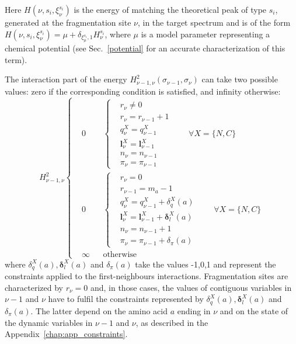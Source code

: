 Here $H(\nu,s_i,\xi_\nu^{s_i})$ is the energy of matching the theoretical peak
of type $s_i$, generated at the fragmentation site $\nu$, in the target spectrum and is
of the form $H(\nu,s_i,\xi_\nu^{s_i})=\mu+\delta_{\xi_\mu^{s_i},1}H_\nu^{s_i}$,
where $\mu$ is a model parameter representing a chemical potential (see
Sec.~\ref{potential} for an accurate characterization of this term).

The interaction part of the energy $H^2_{\nu-1,\nu}(\sigma_{\nu-1},\sigma_\nu)$
can take two possible values: zero if the corresponding condition is satisfied, and infinity
otherwise:
\begin{equation}
H^2_{\nu-1,\nu}
\left\{
\begin{aligned}
&0 && 
\left\{
\begin{aligned}
&r_\nu\ne0\\
&r_\nu=r_{\nu-1}+1\\
&q^X_\nu=q^X_{\nu-1}\\
&{\bm l}^X_\nu={\bm l}^X_{\nu-1}\\
&n_\nu=n_{\nu-1}\\
&\pi_\nu=\pi_{\nu-1}
\end{aligned}
\right.\qquad\forall X=\{N,C\}\\
&0 && 
\left\{
\begin{aligned}
&r_\nu=0\\
&r_{\nu-1}=m_{a}-1\\
&q^X_\nu=q^X_{\nu-1}+\delta_q^X(a)\\
&{\bm l}^X_\nu={\bm l}^X_{\nu-1}+{\bm\delta}_l^X(a)\\
&n_\nu=n_{\nu-1}+1\\
&\pi_\nu=\pi_{\nu-1}+\delta_\pi(a)
\end{aligned}
\right.\qquad\forall X=\{N,C\}\\
&\infty && \text{otherwise}
\end{aligned}
\right.
\label{eq:h2}
\end{equation}
where $\delta_q^X(a),\bm \delta_l^X(a)$ and $\delta_\pi(a)$ take the values -1,0,1
and represent the
constraints applied to the first-neighbours interactions.
Fragmentation sites are characterized by $r_\nu=0$ and, in those cases, the
values of contiguous variables in $\nu-1$ and $\nu$ have to fulfil 
the constraints represented by $\delta_q^X(a),\bm \delta_l^X(a)$ and $\delta_\pi(a)$.
The latter depend on the amino acid $a$ ending in $\nu$ and on the
state of the dynamic variables in $\nu-1$ and $\nu$, as described
in the Appendix~\ref{chap:app_constraints}.


